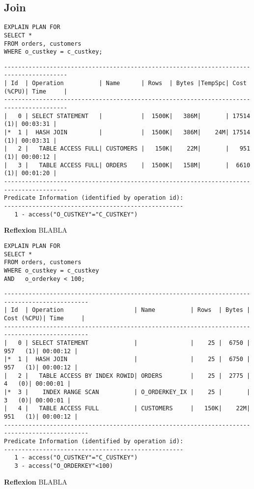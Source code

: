 \documentclass[10pt]{article}
\begin{document}
\subsection{Join}
\begin{lstlisting}[style=sql]
EXPLAIN PLAN FOR
SELECT *
FROM orders, customers
WHERE o_custkey = c_custkey;
\end{lstlisting}
\begin{lstlisting}[style=queryexecutionplan]
----------------------------------------------------------------------------------------
| Id  | Operation          | Name      | Rows  | Bytes |TempSpc| Cost (%CPU)| Time     |
----------------------------------------------------------------------------------------
|   0 | SELECT STATEMENT   |           |  1500K|   386M|       | 17514   (1)| 00:03:31 |
|*  1 |  HASH JOIN         |           |  1500K|   386M|    24M| 17514   (1)| 00:03:31 |
|   2 |   TABLE ACCESS FULL| CUSTOMERS |   150K|    22M|       |   951   (1)| 00:00:12 |
|   3 |   TABLE ACCESS FULL| ORDERS    |  1500K|   158M|       |  6610   (1)| 00:01:20 |
----------------------------------------------------------------------------------------
Predicate Information (identified by operation id):
---------------------------------------------------
   1 - access("O_CUSTKEY"="C_CUSTKEY")
\end{lstlisting}
\textbf{Reflexion} \newline
BLABLA

\begin{lstlisting}[style=sql]
EXPLAIN PLAN FOR
SELECT *
FROM orders, customers
WHERE o_custkey = c_custkey
AND   o_orderkey < 100;
\end{lstlisting}
\begin{lstlisting}[style=queryexecutionplan]
----------------------------------------------------------------------------------------------
| Id  | Operation                    | Name          | Rows  | Bytes | Cost (%CPU)| Time     |
----------------------------------------------------------------------------------------------
|   0 | SELECT STATEMENT             |               |    25 |  6750 |   957   (1)| 00:00:12 |
|*  1 |  HASH JOIN                   |               |    25 |  6750 |   957   (1)| 00:00:12 |
|   2 |   TABLE ACCESS BY INDEX ROWID| ORDERS        |    25 |  2775 |     4   (0)| 00:00:01 |
|*  3 |    INDEX RANGE SCAN          | O_ORDERKEY_IX |    25 |       |     3   (0)| 00:00:01 |
|   4 |   TABLE ACCESS FULL          | CUSTOMERS     |   150K|    22M|   951   (1)| 00:00:12 |
----------------------------------------------------------------------------------------------
Predicate Information (identified by operation id):
---------------------------------------------------
   1 - access("O_CUSTKEY"="C_CUSTKEY")
   3 - access("O_ORDERKEY"<100)
\end{lstlisting}
\textbf{Reflexion} \newline
BLABLA
\end{document}
